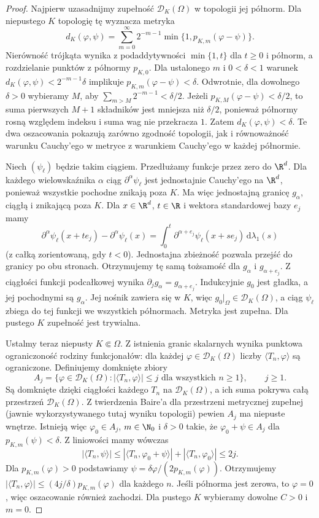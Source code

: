 \begin{proof}
Najpierw uzasadnijmy zupełność $\mathcal D_K(\Omega)$
w topologii jej półnorm. Dla niepustego $K$ topologię
tę wyznacza metryka
\[
 d_K(\varphi,\psi)=\sum_{m=0}^\infty 2^{-m-1}
 \min\{1,p_{K,m}(\varphi-\psi)\}.
\]
Nierówność trójkąta wynika z podaddytywności
$\min\{1,t\}$ dla $t\ge0$ i półnorm, a rozdzielanie
punktów z półnormy $p_{K,0}$.
Dla ustalonego $m$ i $0<\delta<1$ warunek
$d_K(\varphi,\psi)<2^{-m-1}\delta$ implikuje
$p_{K,m}(\varphi-\psi)<\delta$.
Odwrotnie, dla dowolnego $\delta>0$ wybieramy $M$,
aby $\sum_{m>M}2^{-m-1}<\delta/2$.
Jeżeli $p_{K,M}(\varphi-\psi)<\delta/2$,
to suma pierwszych $M+1$ składników jest
mniejsza niż $\delta/2$, ponieważ półnormy
rosną względem indeksu i suma wag nie przekracza $1$.
Zatem $d_K(\varphi,\psi)<\delta$.
Te dwa oszacowania pokazują zarówno zgodność
topologii, jak i równoważność warunku Cauchy'ego
w metryce z warunkiem Cauchy'ego w każdej półnormie.

Niech $(\psi_\ell)$ będzie takim ciągiem.
Przedłużamy funkcje przez zero do $\R^d$.
Dla każdego wielowskaźnika $\alpha$ ciąg
$\partial^\alpha\psi_\ell$ jest jednostajnie
Cauchy'ego na $\R^d$, ponieważ wszystkie
pochodne znikają poza $K$. Ma więc jednostajną
granicę $g_\alpha$, ciągłą i znikającą poza $K$.
Dla $x\in\R^d$, $t\in\R$ i wektora standardowej
bazy $e_j$ mamy
\[
 \partial^\alpha\psi_\ell(x+te_j)
 -\partial^\alpha\psi_\ell(x)
 =\int_0^t
 \partial^{\alpha+e_j}\psi_\ell(x+se_j)\,
 \mathrm d\lambda_1(s)
\]
(z całką zorientowaną, gdy $t<0$).
Jednostajna zbieżność pozwala przejść do granicy
po obu stronach. Otrzymujemy tę samą tożsamość
dla $g_\alpha$ i $g_{\alpha+e_j}$.
Z ciągłości funkcji podcałkowej wynika
$\partial_jg_\alpha=g_{\alpha+e_j}$.
Indukcyjnie $g_0$ jest gładka, a jej pochodnymi
są $g_\alpha$. Jej nośnik zawiera się w $K$,
więc $g_0|_\Omega\in\mathcal D_K(\Omega)$,
a ciąg $\psi_\ell$ zbiega do tej funkcji
we wszystkich półnormach. Metryka jest zupełna.
Dla pustego $K$ zupełność jest trywialna.

Ustalmy teraz niepusty $K\Subset\Omega$.
Z istnienia granic skalarnych wynika punktowa
ograniczoność rodziny funkcjonałów:
dla każdej $\varphi\in\mathcal D_K(\Omega)$
liczby $\langle T_n,\varphi\rangle$ są ograniczone.
Definiujemy domknięte zbiory
\[
 A_j=\{\varphi\in\mathcal D_K(\Omega):
 |\langle T_n,\varphi\rangle|\le j
 \text{ dla wszystkich }n\ge1\},\qquad j\ge1.
\]
Są domknięte dzięki ciągłości każdego $T_n$ na
$\mathcal D_K(\Omega)$, a ich suma pokrywa
całą przestrzeń $\mathcal D_K(\Omega)$.
Z twierdzenia Baire'a dla przestrzeni metrycznej
zupełnej (jawnie wykorzystywanego tutaj wyniku
topologii) pewien $A_j$ ma niepuste wnętrze.
Istnieją więc $\varphi_0\in A_j$, $m\in\N_0$
i $\delta>0$ takie, że
$\varphi_0+\psi\in A_j$ dla $p_{K,m}(\psi)<\delta$.
Z liniowości mamy wówczas
\[
 |\langle T_n,\psi\rangle|
 \le |\langle T_n,\varphi_0+\psi\rangle|
     +|\langle T_n,\varphi_0\rangle|\le2j.
\]
Dla $p_{K,m}(\varphi)>0$ podstawiamy
$\psi=\delta\varphi/(2p_{K,m}(\varphi))$.
Otrzymujemy
$|\langle T_n,\varphi\rangle|
\le(4j/\delta)p_{K,m}(\varphi)$ dla każdego $n$.
Jeśli półnorma jest zerowa, to $\varphi=0$,
więc oszacowanie również zachodzi.
Dla pustego $K$ wybieramy dowolne $C>0$ i $m=0$.


\end{proof}

